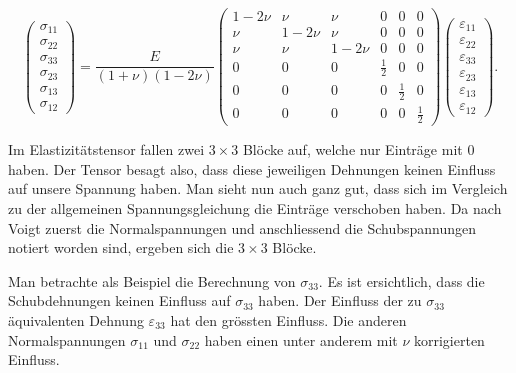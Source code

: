 \begin{equation}
\begin{pmatrix}
	\sigma_{11}\\
	\sigma_{22}\\
	\sigma_{33}\\
	\sigma_{23}\\
	\sigma_{13}\\
	\sigma_{12}
\end{pmatrix}
=
\frac{E}{(1+\nu)(1-2\nu)}
\left(
\begin{array}{ccc|ccc}
	1- 2\nu & \nu     & \nu     & 0           & 0           & 0\\
	    \nu & 1- 2\nu & \nu     & 0           & 0           & 0\\
        \nu & \nu     & 1- 2\nu & 0           & 0           & 0\\
\hline
          0 & 0       & 0       & \frac{1}{2} & 0           & 0\\
          0 & 0       & 0       & 0           & \frac{1}{2} & 0\\
          0 & 0       & 0       & 0           & 0           & \frac{1}{2}
\end{array}
\right)
\begin{pmatrix}
	\varepsilon_{11}\\
	\varepsilon_{22}\\
	\varepsilon_{33}\\
	\varepsilon_{23}\\
	\varepsilon_{13}\\
	\varepsilon_{12}
\end{pmatrix}
.
\label{spannung:Spannungsgleichung}
\end{equation}

Im Elastizitätstensor fallen zwei $3\times3$ Blöcke auf, welche nur Einträge mit $0$ haben. Der Tensor besagt also,
dass diese jeweiligen Dehnungen keinen Einfluss auf unsere Spannung haben.
Man sieht nun auch ganz gut, dass sich im Vergleich zu der allgemeinen Spannungsgleichung die Einträge verschoben haben.
Da nach Voigt zuerst die Normalspannungen und anschliessend die Schubspannungen notiert worden sind, ergeben sich die  $3\times3$ Blöcke.

Man betrachte als Beispiel die Berechnung von $\sigma_{33}$.
Es ist ersichtlich, dass die Schubdehnungen keinen Einfluss auf $\sigma_{33}$ haben.
Der Einfluss der zu $\sigma_{33}$ äquivalenten Dehnung $\varepsilon_{33}$ hat den grössten Einfluss.
Die anderen Normalspannungen $\sigma_{11}$ und $\sigma_{22}$ haben einen unter anderem mit $\nu$ korrigierten Einfluss.


